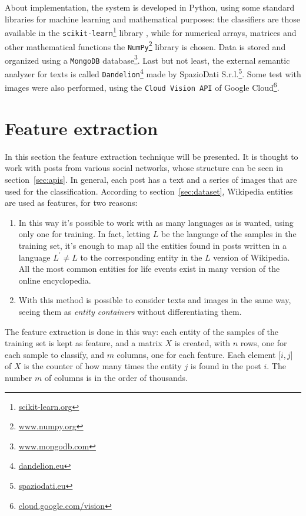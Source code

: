 About implementation, the system is developed in Python, using some standard libraries for machine learning and mathematical purposes: the classifiers are those available in the \texttt{scikit-learn}\footnote{\url{scikit-learn.org}} library \cite{scikit-learn}, while for numerical arrays, matrices and other mathematical functions the \texttt{NumPy}\footnote{\url{www.numpy.org}} library \cite{oliphant2006guide} is chosen. Data is stored and organized using a \texttt{MongoDB} database\footnote{\url{www.mongodb.com}}. Last but not least, the external semantic analyzer for texts is called \texttt{Dandelion}\footnote{\url{dandelion.eu}} made by SpazioDati S.r.l.\footnote{\url{spaziodati.eu}}. Some test with images were also performed, using the \texttt{Cloud Vision API} of Google Cloud\footnote{\url{cloud.google.com/vision}}.

\section{Feature extraction}
\label{sec:featurextraction}
In this section the feature extraction technique will be presented. It is thought to work with posts from various social networks, whose structure can be seen in section~\ref{sec:apis}. In general, each post has a text and a series of images that are used for the classification. According to section~\ref{sec:dataset}, Wikipedia entities are used as features, for two reasons:
\begin{enumerate}
\item In this way it's possible to work with as many languages as is wanted, using only one for training. In fact, letting $ L $ be the language of the samples in the training set, it's enough to map all the entities found in posts written in a language $ L^{'} \ne L $ to the corresponding entity in the $ L $ version of Wikipedia. All the most common entities for life events exist in many version of the online encyclopedia.
\item With this method is possible to consider texts and images in the same way, seeing them as \emph{entity containers} without differentiating them.
\end{enumerate}

The feature extraction is done in this way: each entity of the samples of the training set is kept as feature, and a matrix $X$ is created, with $n$ rows, one for each sample to classify, and $m$ columns, one for each feature. Each element [$i,j$] of $X$ is the counter of how many times the entity $j$ is found in the post $i$. The number $m$ of columns is in the order of thousands.

